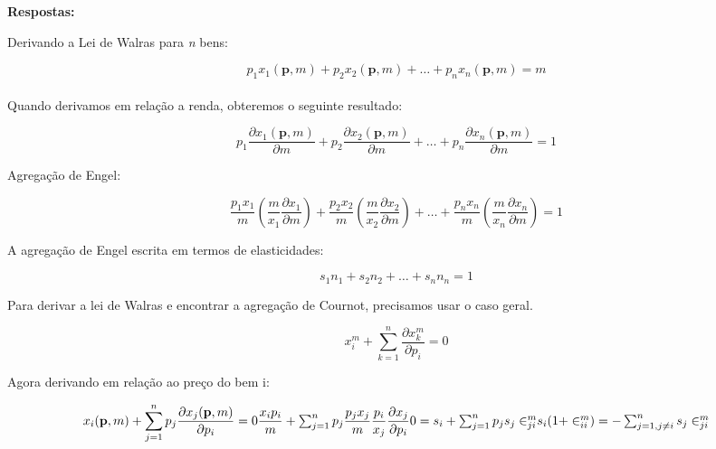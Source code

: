 \begin{flushleft}
\singlespacing

\textbf{Respostas:}

\singlespacing

Derivando a Lei de Walras para \textit{n} bens:

\begin{equation}
	p_{1}x_{1}(\textbf{p},m) + p_{2}x_{2}(\textbf{p},m) + \ldots + p_{n}x_{n}(\textbf{p},m) = m
\end{equation}
\\
Quando derivamos em relação a renda, obteremos o seguinte resultado:

\begin{equation}
	p_{1}\dfrac{\partial x_{1}(\textbf{p},m)}{\partial m} + p_{2}\dfrac{\partial x_{2} (\textbf{p},m)}{\partial m} + \ldots + p_{n}\dfrac{\partial x_{n} (\textbf{p}, m)}{\partial m} = 1
\end{equation}

Agregação de Engel:

\begin{equation}
	\dfrac{p_{1}x_{1}}{m} \left(\dfrac{m}{x_{1}} \dfrac{\partial x_{1}}{\partial m} \right) + 	\dfrac{p_{2}x_{2}}{m} \left(\dfrac{m}{x_{2}} \dfrac{\partial x_{2}}{\partial m} \right) + \ldots + 	\dfrac{p_{n}x_{n}}{m} \left(\dfrac{m}{x_{n}} \dfrac{\partial x_{n}}{\partial m} \right) = 1
\end{equation}

A agregação de Engel escrita em termos de elasticidades:

\begin{equation}
	s_{1}n_{1} + s_{2}n_{2} + \ldots + s_{n}n_{n} = 1
\end{equation}

Para derivar a lei de Walras e encontrar a agregação de Cournot, precisamos usar o caso geral.

\begin{equation}
	x_{i}^{m} + \sum_{k=1}^{n} \dfrac{\partial x_{k}^{m}}{\partial p_{i}} = 0
\end{equation}

Agora derivando em relação ao preço do bem i:

\begin{equation}
	x_{i}(\textbf{p}, m) + \sum_{j=1}^{n}p_{j} \dfrac{\partial x_{j}(\textbf{p}, m)}{\partial p_{i}} = 0 
	$$\\$$
	\dfrac{x_{i}p_{i}}{m} + \sum_{j=1}^{n}p_{j} \dfrac{p_{j}x_{j}}{m}\dfrac{p_{i}}{x_{j}} \dfrac{\partial x_{j}}{\partial p_{i}}
	$$\\$$
	0 = s_{i} + \sum_{j=1}^{n}p_{j} s_{j} \in_{ji}^{m}
	$$\\$$
	s_{i}(1 + \in_{ii}^{m}) = - \sum_{j=1, j\neq i}^{n} s_{j} \in_{ji}^{m}
\end{equation}


\end{flushleft}
